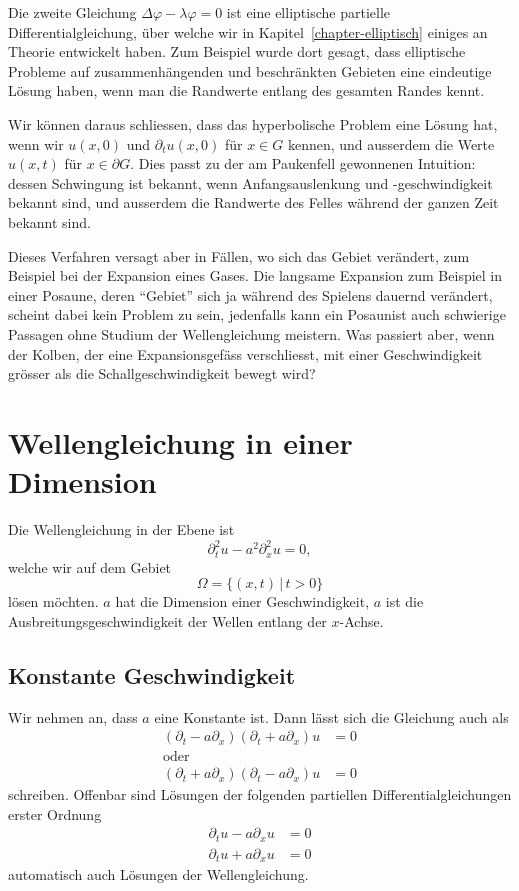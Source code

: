Die zweite Gleichung $\Delta \varphi-\lambda\varphi=0$ ist eine
elliptische partielle Differentialgleichung, über welche wir
in Kapitel~\ref{chapter-elliptisch} einiges an Theorie entwickelt haben.
Zum Beispiel wurde dort gesagt, dass elliptische Probleme auf
zusammenhängenden und beschränkten Gebieten eine eindeutige
Lösung haben, wenn man die Randwerte entlang des gesamten Randes
kennt.

Wir können daraus schliessen, dass das hyperbolische Problem eine
Lösung hat, wenn wir $u(x,0)$ und $\partial_tu(x,0)$ für
$x\in G$ kennen, und ausserdem die Werte $u(x,t)$ für $x\in\partial G$.
Dies passt zu der am Paukenfell gewonnenen Intuition: dessen Schwingung
ist bekannt, wenn Anfangsauslenkung und -geschwindigkeit bekannt sind,
und ausserdem die Randwerte des Felles während der ganzen Zeit
bekannt sind.

Dieses Verfahren versagt aber in Fällen, wo sich das Gebiet verändert,
zum Beispiel bei der Expansion eines Gases.
Die langsame Expansion zum Beispiel in einer Posaune, deren ``Gebiet''
sich ja während des Spielens dauernd verändert, scheint dabei kein
Problem zu sein, jedenfalls kann ein Posaunist auch schwierige Passagen
ohne Studium der Wellengleichung meistern.
Was passiert aber, wenn der
Kolben, der eine Expansionsgefäss verschliesst, mit einer Geschwindigkeit
grösser als die Schallgeschwindigkeit bewegt wird? 

\section{Wellengleichung in einer Dimension}
Die Wellengleichung in der Ebene ist
\[
\partial_t^2u-a^2\partial_x^2u=0,
\]
welche wir auf dem Gebiet
\[
\Omega = \{(x,t) \,|\, t > 0\}
\]
lösen möchten.
$a$ hat die Dimension einer Geschwindigkeit, $a$ ist die
Ausbreitungsgeschwindigkeit der Wellen entlang der $x$-Achse.

\subsection{Konstante Geschwindigkeit}
Wir nehmen an, dass $a$ eine Konstante ist. Dann lässt sich die Gleichung
auch als
\begin{align*}
(\partial_t -a\partial_x)(\partial_t+a\partial_x)u&=0
\\
\text{oder}&
\\
(\partial_t +a\partial_x)(\partial_t-a\partial_x)u&=0
\end{align*}
schreiben.
Offenbar sind Lösungen der folgenden partiellen Differentialgleichungen
erster Ordnung
\begin{align}
\partial_t u-a\partial_x u&=0
\label{wellelinks}
\\
\partial_t u+a\partial_x u&=0
\label{wellerechts}
\end{align}
automatisch auch Lösungen der Wellengleichung.


